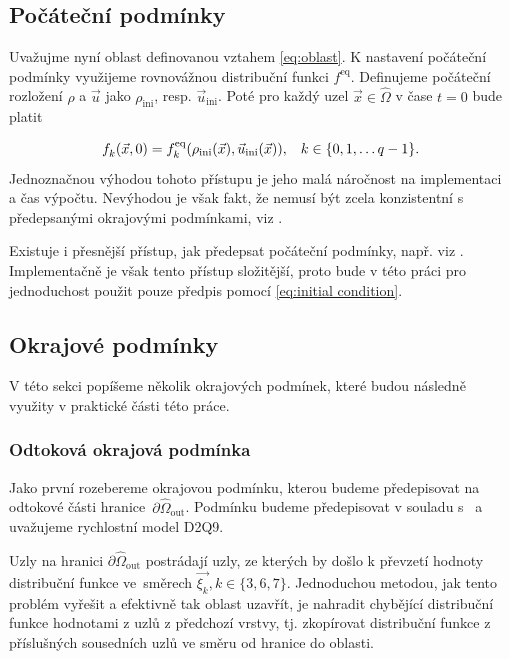 \subsection{Počáteční podmínky}\label{initial conditions}
Uvažujme nyní oblast definovanou vztahem \eqref{eq:oblast}. K nastavení počáteční podmínky využijeme rovnovážnou distribuční funkci $ f^{\mathrm{eq}} $. Definujeme počáteční rozložení $ \rho $ a $ \vec{u} $ jako $ \rho _{\mathrm{ini}} $, resp. $ \vec{u} _{\mathrm{ini}} $. Poté pro každý uzel $ \vec{x} \in \hat{\Omega} $ v čase $ t=0 $ bude platit

\begin{equation}\label{eq:initial condition}
f^{}_{k} (\vec{x}, 0) = f^{\mathrm{eq}}_{k} (\rho _{\mathrm{ini}} (\vec{x}), \vec{u} _{\mathrm{ini}} (\vec{x})), \hspace{3mm} k \in \{0, 1, \dots q-1\}.
\end{equation}
Jednoznačnou výhodou tohoto přístupu je jeho malá náročnost na implementaci a čas výpočtu. Nevýhodou je však fakt, že nemusí být zcela konzistentní s předepsanými okrajovými podmínkami, viz \cite{Kruger}.

Existuje i přesnější přístup, jak předepsat počáteční podmínky, např. viz  \cite{Kruger}. Implementačně je však tento přístup složitější, proto bude v této práci pro jednoduchost použit pouze předpis pomocí \eqref{eq:initial condition}.

\subsection{Okrajové podmínky}\label{boundary conditions}
V této sekci popíšeme několik okrajových podmínek, které budou následně využity v praktické části této práce.
\subsubsection{\fontsize{12}{15}\selectfont Odtoková okrajová podmínka}\label{bc outlet}
Jako první rozebereme okrajovou podmínku, kterou budeme předepisovat na odtokové části hranice~$ \partial \hat{\Omega}_{\mathrm{out}} $. Podmínku budeme předepisovat v souladu s~\cite{GeierCuLBM} a uvažujeme rychlostní model D2Q9.

Uzly na hranici $ \partial \hat{\Omega}_{\mathrm{out}} $ postrádají uzly, ze kterých by došlo k převzetí hodnoty distribuční funkce ve~směrech $ \vec{\xi_{k}} , k \in \{3,6,7\}$. Jednoduchou metodou, jak tento problém vyřešit a efektivně tak oblast uzavřít, je nahradit chybějící distribuční funkce hodnotami z uzlů z předchozí vrstvy, tj. zkopírovat distribuční funkce z příslušných sousedních uzlů ve směru od hranice do oblasti.

